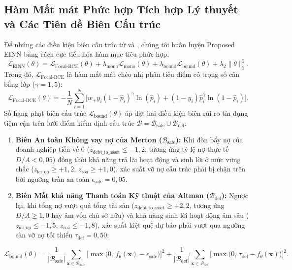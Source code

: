 \documentclass[11pt,a4paper]{article}
\begin{document}
\subsection{Hàm Mất mát Phức hợp Tích hợp Lý thuyết và Các Tiên đề Biên Cấu trúc}
Để nhúng các điều kiện biên cấu trúc từ \citet{merton1974pricing} và \citet{altman1995emerging}, chúng tôi huấn luyện Proposed EINN bằng cách cực tiểu hóa hàm mục tiêu phức hợp:
\begin{equation}
    \mathcal{L}_{\text{EINN}}(\theta) = \mathcal{L}_{\text{Focal-BCE}}(\theta) + \lambda_{\text{mono}} \mathcal{L}_{\text{mono}}(\theta) + \lambda_{\text{bound}} \mathcal{L}_{\text{bound}}(\theta) + \lambda_2 \|\theta\|_2^2.
    \label{eq:total_loss}
\end{equation}
Trong đó, $\mathcal{L}_{\text{Focal-BCE}}$ là hàm mất mát chéo nhị phân tiêu điểm có trọng số cân bằng lớp ($\gamma = 1,5$):
\begin{equation}
    \mathcal{L}_{\text{Focal-BCE}}(\theta) = -\frac{1}{N}\sum_{i=1}^N \Big[ w_+ y_i (1 - \hat{p}_i)^\gamma \ln(\hat{p}_i) + (1 - y_i)\hat{p}_i^\gamma \ln(1 - \hat{p}_i) \Big].
\end{equation}
Số hạng phạt biên cấu trúc $\mathcal{L}_{\text{bound}}(\theta)$ áp đặt hai điều kiện biên rủi ro tín dụng tiệm cận trên lưới điểm kiểm định cấu trúc $\mathcal{B} = \mathcal{B}_{\text{safe}} \cup \mathcal{B}_{\text{def}}$:
\begin{enumerate}
    \item \textbf{Biên An toàn Không vay nợ của Merton ($\mathcal{B}_{\text{safe}}$):} Khi đòn bẩy nợ của doanh nghiệp tiến về $0$ ($z_{\text{debt\_to\_asset}} \le -1,2$, tương ứng tỷ lệ nợ thực tế $D/A < 0,05$) đồng thời khả năng trả lãi hoạt động và sinh lời ở mức vững chắc ($z_{\text{icr\_op}} \ge +1,2$, $z_{\text{roa}} \ge +1,0$), xác suất vỡ nợ cấu trúc phải bị chặn trên bởi ngưỡng trần an toàn $\epsilon_{\text{safe}} = 0,05$.
    \item \textbf{Biên Mất khả năng Thanh toán Kỹ thuật của Altman ($\mathcal{B}_{\text{def}}$):} Ngược lại, khi tổng nợ vượt quá tổng tài sản ($z_{\text{debt\_to\_asset}} \ge +2,2$, tương ứng $D/A \ge 1,0$ hay âm vốn chủ sở hữu) và khả năng sinh lời hoạt động âm sâu ($z_{\text{icr\_op}} \le -1,5$, $z_{\text{roa}} \le -1,8$), xác suất kiệt quệ dự báo phải vượt qua ngưỡng sàn vỡ nợ tối thiểu $\tau_{\text{def}} = 0,50$:
\end{enumerate}
\begin{equation}
    \mathcal{L}_{\text{bound}}(\theta) = \frac{1}{|\mathcal{B}_{\text{safe}}|} \sum_{\mathbf{x} \in \mathcal{B}_{\text{safe}}} \Big[\max\big(0, \, f_\theta(\mathbf{x}) - \epsilon_{\text{safe}}\big)\Big]^2 + \frac{1}{|\mathcal{B}_{\text{def}}|} \sum_{\mathbf{x} \in \mathcal{B}_{\text{def}}} \Big[\max\big(0, \, \tau_{\text{def}} - f_\theta(\mathbf{x})\big)\Big]^2.
\end{equation}
\end{document}
